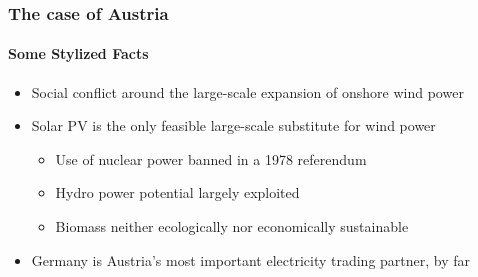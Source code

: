\documentclass[aspectratio=1610, xcolor=dvipsnames,handout]{beamer} %
\begin{document}
    \begin{frame}
        \frametitle{The case of Austria}
        \framesubtitle{Some Stylized Facts}
        \begin{itemize}
            \item Social conflict around the large-scale expansion of onshore wind power
            \item Solar PV is the only feasible large-scale substitute for wind power
            \begin{itemize}
                \item Use of nuclear power banned in a 1978 referendum
                \item Hydro power potential largely exploited
                \item Biomass neither ecologically nor economically sustainable
            \end{itemize}
            \item Germany is Austria's most important electricity trading partner, by far
        \end{itemize}
    \end{frame}
%
%
%
\end{document}
